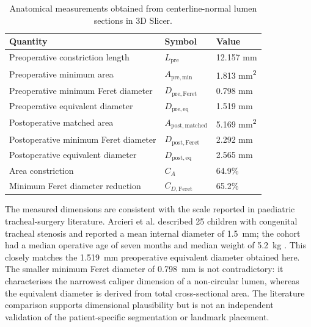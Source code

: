 \documentclass[11pt,a4paper]{article}
\begin{document}
\begin{table}[htbp]
  \centering
  \caption{Anatomical measurements obtained from centerline-normal lumen
  sections in 3D Slicer.}
  \label{tab:anatomical_measurements}
  \begin{tabular}{@{}lll@{}}
    \toprule
    Quantity & Symbol & Value \\
    \midrule
    Preoperative constriction length & $L_{\mathrm{pre}}$ & 12.157 \si{\milli\metre} \\
    Preoperative minimum area & $A_{\mathrm{pre,min}}$ & 1.813 \si{\milli\metre\squared} \\
    Preoperative minimum Feret diameter & $D_{\mathrm{pre,Feret}}$ & 0.798 \si{\milli\metre} \\
    Preoperative equivalent diameter & $D_{\mathrm{pre,eq}}$ & 1.519 \si{\milli\metre} \\
    Postoperative matched area & $A_{\mathrm{post,matched}}$ & 5.169 \si{\milli\metre\squared} \\
    Postoperative minimum Feret diameter & $D_{\mathrm{post,Feret}}$ & 2.292 \si{\milli\metre} \\
    Postoperative equivalent diameter & $D_{\mathrm{post,eq}}$ & 2.565 \si{\milli\metre} \\
    Area constriction & $C_A$ & 64.9\% \\
    Minimum Feret diameter reduction & $C_{D,\mathrm{Feret}}$ & 65.2\% \\
    \bottomrule
  \end{tabular}
\end{table}

The measured dimensions are consistent with the scale reported in paediatric
tracheal-surgery literature. Arcieri et al. described 25 children with congenital
tracheal stenosis and reported a mean internal diameter of
\SI{1.5}{\milli\metre}; the cohort had a median operative age of seven months and
median weight of \SI{5.2}{\kilogram} \cite{arcieri2018}. This closely matches the
\SI{1.519}{\milli\metre} preoperative equivalent diameter obtained here. The
smaller minimum Feret diameter of \SI{0.798}{\milli\metre} is not contradictory:
it characterises the narrowest caliper dimension of a non-circular lumen, whereas
the equivalent diameter is derived from total cross-sectional area. The
literature comparison supports dimensional plausibility but is not an independent
validation of the patient-specific segmentation or landmark placement.
\end{document}

